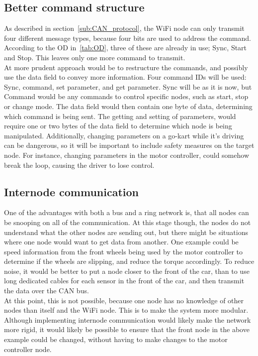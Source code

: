 \subsection*{Better command structure}
As described in section~\ref{sub:CAN_protocol}, the WiFi node can only transmit four different message types, because four bits are used to address the command. 
According to the OD in~\ref{tab:OD}, three of these are already in use; Sync, Start and Stop. 
This leaves only one more command to transmit.\\

At more prudent approach would be to restructure the commands, and possibly use the data field to convey more information. 
Four command IDs will be used: Sync, command, set parameter, and get parameter. 
Sync will be as it is now, but Command would be any commands to control specific nodes, such as start, stop or change mode. 
The data field would then contain one byte of data, determining which command is being sent.
The getting and setting of parameters, would require one or two bytes of the data field to determine which node is being manipulated.
Additionally, changing parameters on a go-kart while it's driving can be dangerous, so it will be important to include safety measures on the target node.
For instance, changing parameters in the motor controller, could somehow break the loop, causing the driver to lose control.

\subsection*{Internode communication}
One of the advantages with both a bus and a ring network is, that all nodes can be snooping on all of the communication.
At this stage though, the nodes do not understand what the other nodes are sending out, but there might be situations where one node would want to get data from another.
One example could be speed information from the front wheels being used by the motor controller to determine if the wheels are slipping, and reduce the torque accordingly. 
To reduce noise, it would be better to put a node closer to the front of the car, than to use long dedicated cables for each sensor in the front of the car, and then transmit the data over the CAN bus.\\

At this point, this is not possible, because one node has no knowledge of other nodes than itself and the WiFi node. 
This is to make the system more modular.
Although implementing internode communication would likely make the network more rigid, it would likely be possible to ensure that the front node in the above example could be changed, without having to make changes to the motor controller node.